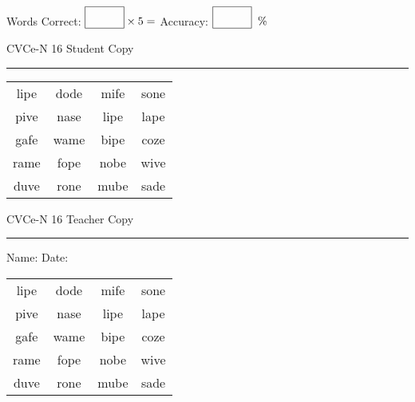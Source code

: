 \documentclass{memoir}
\begin{document}
\small

Words Correct: $\fbox{\phantom{\huge 100}} \times 5 = $ Accuracy: $\fbox{\phantom{\huge 100}}\;\; \%$ 

\vfill

\newpage


\footnotesize \noindent
CVCe-N 16 \hfill Student Copy
\smallskip
\hrule

\Large

\setlength{\tabcolsep}{14pt}
\def\arraystretch{2}

{\selectfont


\begin{vplace}[0.5]
\begin{center}
\begin{tabular}{cccc}
lipe & dode & mife & sone \\
pive & nase & lipe & lape \\
gafe & wame & bipe & coze \\
rame & fope & nobe & wive \\
duve & rone & mube & sade \\
\end{tabular}
\end{center}
\end{vplace}

}

\newpage

\footnotesize \noindent
CVCe-N 16 \hfill Teacher Copy
\smallskip
\hrule

\small

\vfill

\noindent
Name: \underline{\hspace{1.75in}} \hfill Date: \underline{\hspace{1in}}

\Large

{\selectfont


\begin{vplace}[0.5]
\begin{center}
\begin{tabular}{cccc}
lipe & dode & mife & sone \\
pive & nase & lipe & lape \\
gafe & wame & bipe & coze \\
rame & fope & nobe & wive \\
duve & rone & mube & sade \\
\end{tabular}
\end{center}
\end{vplace}



}
\end{document}
